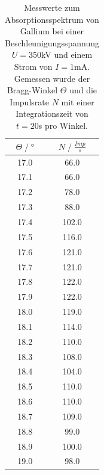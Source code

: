 \begin{table}[H]
    \centering
    \begin{tabular}{c c}
        \toprule
        $\Theta\;/\;°$& $N\;/\;\frac{Imp}{s}$\\
        \midrule
        17.0&    66.0\\
        17.1&    66.0\\
        17.2&    78.0\\
        17.3&    88.0\\
        17.4&    102.0\\
        17.5&    116.0\\
        17.6&    121.0\\
        17.7&    121.0\\
        17.8&    122.0\\
        17.9&    122.0\\
        18.0&    119.0\\
        18.1&    114.0\\
        18.2&    110.0\\
        18.3&    108.0\\
        18.4&    104.0\\
        18.5&    110.0\\
        18.6&    110.0\\
        18.7&    109.0\\
        18.8&    99.0\\
        18.9&    100.0\\
        19.0&    98.0\\
        \bottomrule
    \end{tabular}
    \caption{Messwerte zum Absorptionsspektrum von Gallium bei einer Beschleunigungsspannung 
    $U=350$kV und einem Strom von $I=1$mA.\\
    Gemessen wurde der Bragg-Winkel $\Theta$ und die Impulsrate $N$ mit einer Integrationszeit
    von $t=20$s pro Winkel.}
\end{table}
